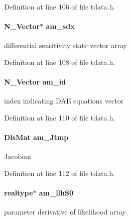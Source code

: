 Definition at line 106 of file tdata.\+h.

\hypertarget{struct_temp_data_a2457438c1ae3ea571031bc3c2e440da2}{}
\paragraph[{am\+\_\+sdx}]{\setlength{\rightskip}{0pt plus 5cm}N\+\_\+\+Vector$\ast$ am\+\_\+sdx}\label{struct_temp_data_a2457438c1ae3ea571031bc3c2e440da2}
differential sensitivity state vector array 

Definition at line 108 of file tdata.\+h.

\hypertarget{struct_temp_data_ad918917fdce710fbd6fe9774e35bfcfb}{}
\paragraph[{am\+\_\+id}]{\setlength{\rightskip}{0pt plus 5cm}N\+\_\+\+Vector am\+\_\+id}\label{struct_temp_data_ad918917fdce710fbd6fe9774e35bfcfb}
index indicating D\+A\+E equations vector 

Definition at line 110 of file tdata.\+h.

\hypertarget{struct_temp_data_aa850cd4b6b24d0b98b4aac8f42a057a1}{}
\paragraph[{am\+\_\+\+Jtmp}]{\setlength{\rightskip}{0pt plus 5cm}Dls\+Mat am\+\_\+\+Jtmp}\label{struct_temp_data_aa850cd4b6b24d0b98b4aac8f42a057a1}
Jacobian 

Definition at line 112 of file tdata.\+h.

\hypertarget{struct_temp_data_ac8e571186f15f3172f69d2e016023fbc}{}
\paragraph[{am\+\_\+llh\+S0}]{\setlength{\rightskip}{0pt plus 5cm}realtype$\ast$ am\+\_\+llh\+S0}\label{struct_temp_data_ac8e571186f15f3172f69d2e016023fbc}
parameter derivative of likelihood array 

